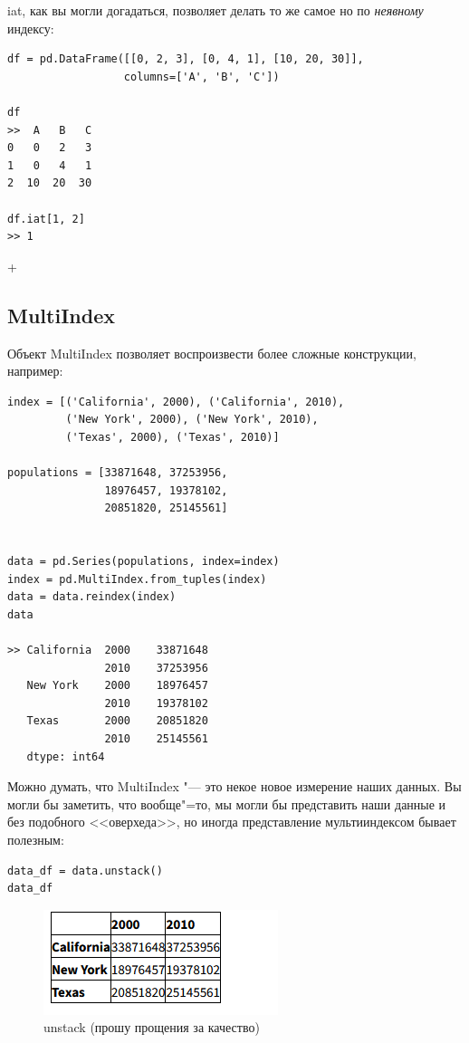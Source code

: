\documentclass{article}
\begin{document}
iat, как вы могли догадаться, позволяет делать то же самое но по \textit{неявному} индексу:
\begin{verbatim}
df = pd.DataFrame([[0, 2, 3], [0, 4, 1], [10, 20, 30]],
                  columns=['A', 'B', 'C'])

df
>>  A   B   C
0   0   2   3
1   0   4   1
2  10  20  30

df.iat[1, 2]
>> 1
\end{verbatim}
+
 
\subsection*{MultiIndex}
Объект MultiIndex позволяет воспроизвести более сложные конструкции, например:
\begin{verbatim}
index = [('California', 2000), ('California', 2010),
         ('New York', 2000), ('New York', 2010),
         ('Texas', 2000), ('Texas', 2010)]
         
populations = [33871648, 37253956,
               18976457, 19378102,
               20851820, 25145561]

               
data = pd.Series(populations, index=index)
index = pd.MultiIndex.from_tuples(index)
data = data.reindex(index)
data

>> California  2000    33871648
               2010    37253956
   New York    2000    18976457
               2010    19378102
   Texas       2000    20851820
               2010    25145561
   dtype: int64
\end{verbatim}

Можно думать, что MultiIndex "--- это некое новое измерение наших данных. Вы могли бы заметить, что вообще"=то, мы могли бы представить наши данные и без подобного <<оверхеда>>, но иногда представление мультииндексом бывает полезным:
\begin{verbatim}
data_df = data.unstack()
data_df
\end{verbatim}

\begin{figure}
    \centering
    \includegraphics[width=0.55\linewidth]{unstack.png}
    \caption{unstack (прошу прощения за качество)}
    \label{fig:enter-label}
\end{figure}
\end{document}
